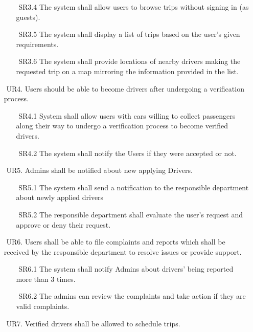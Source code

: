 \documentclass[a4paper, 12pt]{report} %
\begin{document}
\begin{itemize}
\begin{itemize}
                    \item [$ $] SR3.4 The system shall allow users to browse trips without signing in (as guests).
                    \item [$ $] SR3.5 The system shall display a list of trips based on the user's given requirements.
                    \item [$ $] SR3.6 The system shall provide locations of nearby drivers making the requested trip on a map mirroring the information provided in the list. 
                \end{itemize}
               \item [$ $] UR4. Users should be able to become drivers after undergoing a verification process. 
               \begin{itemize}
                   \item [$ $] SR4.1 System shall allow users with cars willing to collect passengers along their way to undergo a verification process to become verified drivers.
                    \item [$ $] SR4.2 The system shall notify the Users if they were accepted or not.
               \end{itemize}            
                \item [$ $] UR5. Admins shall be notified about new applying Drivers.
                \begin{itemize}
                    \item [$ $] SR5.1 The system shall send a notification to the responsible department about newly applied drivers
                    \item [$ $] SR5.2 The responsible department shall evaluate the user’s request and approve or deny their request. 
                \end{itemize}
                \item [$ $] UR6. Users shall be able to file complaints and reports which shall be received by the responsible department to resolve issues or provide support.
                \begin{itemize}
                    \item [$ $] SR6.1 The system shall notify Admins about drivers’ being reported more than 3 times.
                    \item [$ $] SR6.2 The admins can review the complaints and take action if they are valid complaints.
                \end{itemize}
                \item [$ $] UR7. Verified drivers shall be allowed to schedule trips.

\end{itemize}
\end{document}
